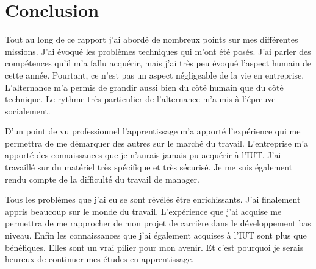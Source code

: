 \chapter*{Conclusion}

Tout au long de ce rapport j'ai abordé de nombreux points sur mes différentes missions. J'ai évoqué les problèmes techniques qui m'ont été posés. J'ai parler des compétences qu'il m'a fallu acquérir, mais j'ai très peu évoqué l'aspect humain de cette année. Pourtant, ce n'est pas un aspect négligeable de la vie en entreprise. L'alternance m'a permis de grandir aussi bien du côté humain que du côté technique. Le rythme très particulier de l'alternance m'a mis à l'épreuve socialement. 

D'un point de vu professionnel l'apprentissage m'a apporté l'expérience qui me permettra de me démarquer des autres sur le marché du travail. L'entreprise m'a apporté des connaissances que je n'aurais jamais pu acquérir à l'IUT. J'ai travaillé sur du matériel très spécifique et très sécurisé. Je me suis également rendu compte de la difficulté du travail de manager. 

Tous les problèmes que j'ai eu se sont révélés être enrichissants. J'ai finalement appris beaucoup sur le monde du travail. L'expérience que j'ai acquise me permettra de me rapprocher de mon projet de carrière dans le développement bas niveau. Enfin les connaissances que j'ai également acquises à l'IUT sont plus que bénéfiques. Elles sont un vrai pilier pour mon avenir. Et c'est pourquoi je serais heureux de continuer mes études en apprentissage.

